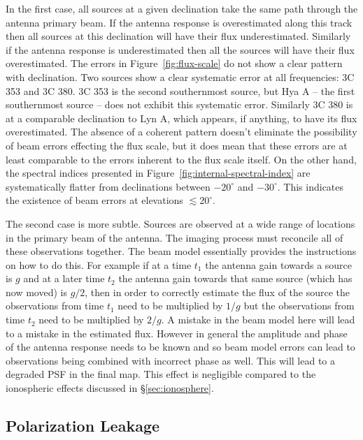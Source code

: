 \documentclass[twocolumn]{aastex61}
\begin{document}
In the first case, all sources at a given declination take the same path through the antenna primary
beam. If the antenna response is overestimated along this track then all sources at this declination
will have their flux underestimated. Similarly if the antenna response is underestimated then all
the sources will have their flux overestimated. The errors in Figure~\ref{fig:flux-scale} do not
show a clear pattern with declination. Two sources show a clear systematic error at all frequencies:
3C 353 and 3C 380. 3C 353 is the second southernmost source, but Hya A -- the first southernmost
source -- does not exhibit this systematic error. Similarly 3C 380 is at a comparable declination to
Lyn A, which appears, if anything, to have its flux overestimated. The absence of a coherent pattern
doesn't eliminate the possibility of beam errors effecting the flux scale, but it does mean that
these errors are at least comparable to the errors inherent to the flux scale itself. On the other
hand, the spectral indices presented in Figure~\ref{fig:internal-spectral-index} are systematically
flatter from declinations between $-20^\circ$ and $-30^\circ$. This indicates the existence of beam
errors at elevations $\lesssim20^\circ$.

The second case is more subtle. Sources are observed at a wide range of locations in the primary
beam of the antenna. The imaging process must reconcile all of these observations together. The beam
model essentially provides the instructions on how to do this. For example if at a time $t_1$ the
antenna gain towards a source is $g$ and at a later time $t_2$ the antenna gain towards that same
source (which has now moved) is $g/2$, then in order to correctly estimate the flux of the source
the observations from time $t_1$ need to be multiplied by $1/g$ but the observations from time $t_2$
need to be multiplied by $2/g$. A mistake in the beam model here will lead to a mistake in the
estimated flux.  However in general the amplitude and phase of the antenna response needs to be
known and so beam model errors can lead to observations being combined with incorrect phase as well.
This will lead to a degraded PSF in the final map. This effect is negligible compared to the
ionospheric effects discussed in \S\ref{sec:ionosphere}.

\subsection{Polarization Leakage}
\end{document}
